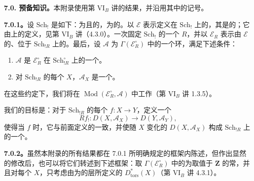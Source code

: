 \textbf{7.0. 预备知识。}本附录使用第 VI$_B$ 讲的结果，并沿用其中的记号。

\textbf{7.0.1。}设 $\mathrm{Sch}_!$ 是如下：为且的，为的。以 $\mathscr E$ 表示定义在 $\mathrm{Sch}_!$ 上的，其是的；它由上的定义，见第 VI$_B$ 讲（4.3.0）。一次固定 $\mathrm{Sch}_!$ 的一个 $R$，并以 $\mathscr E_R$ 表示由 $\mathscr E$ 的、位于 $\mathrm{Sch}_{!R}$ 上的。最后，设 $\mathscr A$ 为 $\Gamma(\mathscr E_R^\circ)$ 中的一个环，满足下述条件：
\begin{enumerate}
\item[(i)] $\mathscr A$ 是 $\mathscr E_R^\circ$ 在 $\mathrm{Sch}_{!R}^\circ$ 上的一个。
\item[(ii)] 对 $\mathrm{Sch}_{!R}$ 的每个 $X$，$\mathscr A_X$ 是一个。
\end{enumerate}
在这些约定下，我们将在 $\operatorname{Mod}(\mathscr E_R^\circ,\mathscr A)$ 中工作（第 VI$_B$ 讲 1.3.5）。

我们的目标是：对于 $\mathrm{Sch}_{!R}$ 的每个 $f:X\to Y$，定义一个
\[Rf_!:D(X,\mathscr A_X)\longrightarrow D(Y,\mathscr A_Y),\]
使得当 $f$ 时，它与前面定义的一致，并使随 $X$ 变化的 $D(X,\mathscr A_X)$ 构成 $\mathrm{Sch}_{!R}$ 上的一个。

\textbf{7.0.2。}虽然本附录的所有结果都在 7.0.1 所明确规定的框架内陈述，但作出显然的修改后，也可以将它们转述到下述框架：取 $\Gamma(\mathscr E_R^\circ)$ 中的为取值于 $\mathbf Z$ 的常，并且对每个 $X$，只考虑由为的层所定义的 $D^*_{\mathrm{tors}}(X)$（第 VI$_B$ 讲 4.3.1）。

